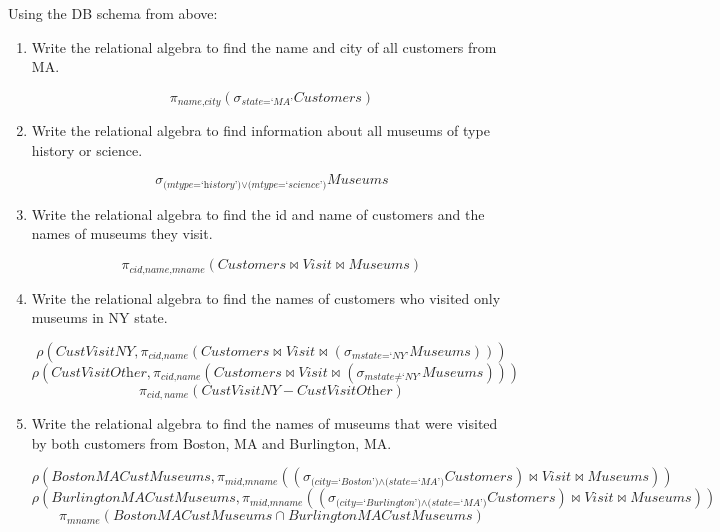 \documentclass[letterpaper, 11pt]{article}
\begin{document}
Using the DB schema from above:
\begin{enumerate}[leftmargin=*]
    \item Write the relational algebra to find the name and city of all customers from MA.
    \begin{tcolorbox}
    \[\pi_{\textit{name,city}}\left(\sigma_{\textit{state=`MA'}}\textit{Customers}\right)\]
    \end{tcolorbox}
    \item Write the relational algebra to find information about all museums of type history or science.
    \begin{tcolorbox}
    \[\sigma_{\textit{(mtype=`history')} \vee \textit{(mtype=`science')}}\textit{Museums}\]
    \end{tcolorbox}
    \item Write the relational algebra to find the id and name of customers and the names of museums they visit.
    \begin{tcolorbox}
    \[\pi_{\textit{cid,name,mname}}\left(\textit{Customers} \bowtie \textit{Visit} \bowtie \textit{Museums}\right)\]    
    \end{tcolorbox}
    \item Write the relational algebra to find the names of customers who visited only museums in NY state.
    \begin{tcolorbox}
    \[\rho\left(\textit{CustVisitNY}, \pi_{\textit{cid,name}}\left(\textit{Customers} \bowtie \textit{Visit} \bowtie \left(\sigma_{\textit{mstate=`NY'}} \textit{Museums}\right)\right)\right)\]
    \[\rho\left(\textit{CustVisitOther}, \pi_{\textit{cid,name}}\left(\textit{Customers} \bowtie \textit{Visit} \bowtie \left(\sigma_{\textit{mstate}\neq\textit{`NY'}} \textit{Museums}\right)\right)\right)\]
    \[\pi_{cid,name}\left(\textit{CustVisitNY} - \textit{CustVisitOther}\right)\]
    \end{tcolorbox}
    \item Write the relational algebra to find the names of museums that were visited by both customers from Boston, MA and Burlington, MA.
    \begin{tcolorbox}
    \[\rho\left(\textit{BostonMACustMuseums}, \pi_{\textit{mid,mname}}\left(\left(\sigma_{\textit{(city=`Boston')} \wedge \textit{(state=`MA')}} \textit{Customers}\right) \bowtie \textit{Visit} \bowtie \textit{Museums}\right)\right)\]
    \[\rho\left(\textit{BurlingtonMACustMuseums}, \pi_{\textit{mid,mname}}\left(\left(\sigma_{\textit{(city=`Burlington')} \wedge \textit{(state=`MA')}} \textit{Customers}\right) \bowtie \textit{Visit} \bowtie \textit{Museums}\right)\right)\]
    \[\pi_{\textit{mname}}\left(\textit{BostonMACustMuseums} \cap \textit{BurlingtonMACustMuseums}\right)\]    
    \end{tcolorbox}
\end{enumerate}
\end{document}
